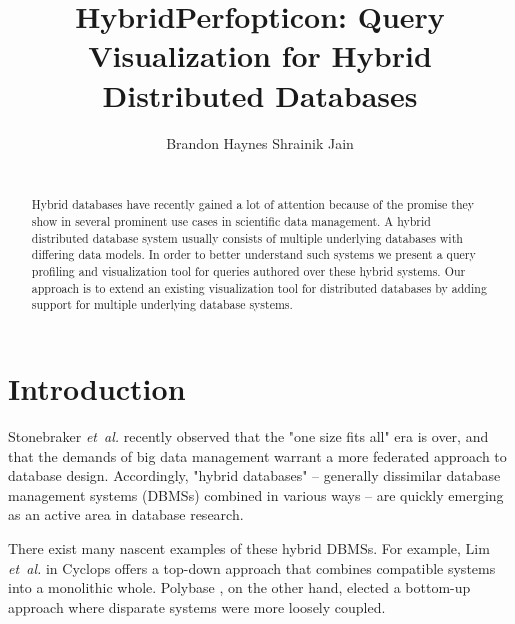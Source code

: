 \documentclass{chi2009}
\newcommand{\ea}{{\em et~al.} }
\begin{document}
\setlength{\paperheight}{11in}
\setlength{\paperwidth}{8.5in}
\setlength{\pdfpageheight}{\paperheight}
\setlength{\pdfpagewidth}{\paperwidth}

\toappear{}

\title{HybridPerfopticon: Query Visualization for Hybrid Distributed Databases}
\author{\alignauthor Brandon Haynes \hspace{3em} Shrainik Jain \\
 \\
} 

\maketitle

\begin{abstract}
Hybrid databases have recently gained a lot of attention because of the promise they show in several prominent use cases in scientific data management. A hybrid distributed database system usually consists of multiple underlying databases with differing data models. In order to better understand such systems we present a query profiling and visualization tool for queries authored over these hybrid systems. Our approach is to extend an existing visualization tool for distributed databases  by adding support for multiple underlying database systems.
\end{abstract}



\section{Introduction}
Stonebraker \ea \cite{stonebraker2007end} recently observed that the "one size fits all" era is over, and that the demands of big data management warrant a more federated approach to database design. Accordingly, "hybrid databases" -- generally dissimilar database management systems (DBMSs) combined in various ways -- are quickly emerging as an active area in database research. 

There exist many nascent examples of these hybrid DBMSs.  For example, Lim \ea in Cyclops \cite{cyclops} offers a top-down approach that combines compatible systems into a monolithic whole. Polybase \cite{polybase}, on the other hand, elected a bottom-up approach where disparate systems were more loosely coupled. 
\end{document}
